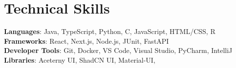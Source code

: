 \documentclass[letterpaper,11pt]{article}
\begin{document}
%
\section{Technical Skills}
 \begin{itemize}[leftmargin=0.15in, label={}]
    \small{\item{
     \textbf{Languages}{: Java, TypeScript, Python, C, JavaScript, HTML/CSS, R} \\
     \textbf{Frameworks}{: React, Next.js, Node.js, JUnit, FastAPI} \\
     \textbf{Developer Tools}{: Git, Docker, VS Code, Visual Studio, PyCharm, IntelliJ} \\
     \textbf{Libraries}{: Aceterny UI, ShadCN UI, Material-UI,} \\
    }}
 \end{itemize}


\end{document}
